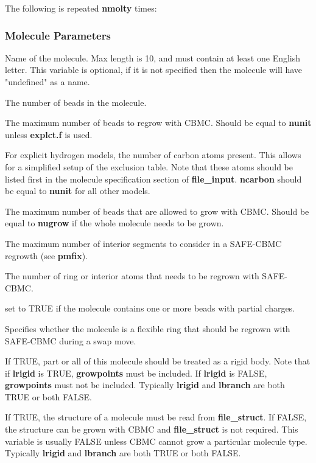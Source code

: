 \documentclass[12pt,letterpaper]{article}
\begin{document}
The following is repeated {\bf nmolty} times:

\subsubsection{Molecule Parameters}

 Name of the molecule. Max length
is 10, and must contain at least one English letter. This
variable is optional, if it is not specified then the molecule
will have "undefined" as a name.

 The number of beads in the molecule.

 The maximum number of beads to regrow
with CBMC. Should be equal to {\bf nunit} unless {\bf
  explct.f} is used.

 For explicit hydrogen models, the
number of carbon atoms present. This allows for a simplified
setup of the exclusion table. Note that these atoms should
be listed first in the molecule specification section of
{\bf file\_input}. {\bf ncarbon} should be equal to {\bf
  nunit} for all other models.

 The maximum number of beads that are
allowed to grow with CBMC. Should be equal to {\bf nugrow}
if the whole molecule needs to be grown.

 The maximum number of interior
segments to consider in a SAFE-CBMC regrowth (see {\bf
  pmfix}).

 The number of ring or interior atoms 
that needs to be regrown with SAFE-CBMC.

 set to TRUE if the molecule contains
one or more beads with partial charges.

 Specifies whether the molecule is a
flexible ring that should be regrown with SAFE-CBMC during a
swap move.

 If TRUE, part or all of this molecule
should be treated as a rigid body. Note that if {\bf lrigid}
is TRUE, {\bf growpoints} must be included. If {\bf lrigid}
is FALSE, {\bf growpoints} must not be included. Typically
{\bf lrigid} and {\bf lbranch} are both TRUE or both FALSE.

 If TRUE, the structure of a molecule
must be read from {\bf file\_struct}. If FALSE, the
structure can be grown with CBMC and {\bf file\_struct} is
not required. This variable is usually FALSE unless CBMC
cannot grow a particular molecule type. Typically {\bf
  lrigid} and {\bf lbranch} are both TRUE or both FALSE.
\end{document}
